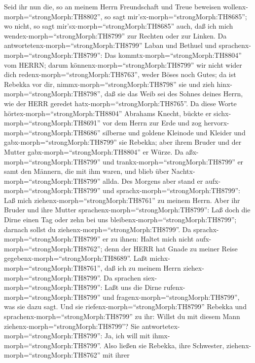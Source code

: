  Seid ihr nun die, so an meinem Herrn Freundschaft und
Treue beweisen wollenx-morph=``strongMorph:TH8802'', so sagt
mir'sx-morph=``strongMorph:TH8685''; wo nicht, so sagt
mir'sx-morph=``strongMorph:TH8685'' auch, daß ich mich
wendex-morph=``strongMorph:TH8799'' zur Rechten oder zur Linken.
 Da antwortetenx-morph=``strongMorph:TH8799'' Laban und
Bethuel und sprachenx-morph=``strongMorph:TH8799'': Das
kommtx-morph=``strongMorph:TH8804'' vom HERRN; darum
könnenx-morph=``strongMorph:TH8799'' wir nicht wider dich
redenx-morph=``strongMorph:TH8763'', weder Böses noch Gutes;
 da ist Rebekka vor dir, nimmx-morph=``strongMorph:TH8798''
sie und zieh hinx-morph=``strongMorph:TH8798'', daß sie das Weib sei des
Sohnes deines Herrn, wie der HERR geredet
hatx-morph=``strongMorph:TH8765''.  Da diese Worte
hörtex-morph=``strongMorph:TH8804'' Abrahams Knecht, bückte er
sichx-morph=``strongMorph:TH8691'' vor dem Herrn zur Erde 
und zog hervorx-morph=``strongMorph:TH8686'' silberne und goldene
Kleinode und Kleider und gabx-morph=``strongMorph:TH8799'' sie Rebekka;
aber ihrem Bruder und der Mutter gabx-morph=``strongMorph:TH8804'' er
Würze.  Da aßx-morph=``strongMorph:TH8799'' und
trankx-morph=``strongMorph:TH8799'' er samt den Männern, die mit ihm
waren, und blieb über Nachtx-morph=``strongMorph:TH8799'' allda. Des
Morgens aber stand er aufx-morph=``strongMorph:TH8799'' und
sprachx-morph=``strongMorph:TH8799'': Laß mich
ziehenx-morph=``strongMorph:TH8761'' zu meinem Herrn.  Aber
ihr Bruder und ihre Mutter sprachenx-morph=``strongMorph:TH8799'': Laß
doch die Dirne einen Tag oder zehn bei uns
bleibenx-morph=``strongMorph:TH8799''; darnach sollst du
ziehenx-morph=``strongMorph:TH8799''.  Da
sprachx-morph=``strongMorph:TH8799'' er zu ihnen: Haltet mich nicht
aufx-morph=``strongMorph:TH8762''; denn der HERR hat Gnade zu meiner
Reise gegebenx-morph=``strongMorph:TH8689''. Laßt
michx-morph=``strongMorph:TH8761'', daß ich zu meinem Herrn
ziehex-morph=``strongMorph:TH8799''.  Da sprachen
siex-morph=``strongMorph:TH8799'': Laßt uns die Dirne
rufenx-morph=``strongMorph:TH8799'' und
fragenx-morph=``strongMorph:TH8799'', was sie dazu sagt. 
Und sie riefenx-morph=``strongMorph:TH8799'' Rebekka und
sprachenx-morph=``strongMorph:TH8799'' zu ihr: Willst du mit diesem Mann
ziehenx-morph=``strongMorph:TH8799''? Sie
antwortetex-morph=``strongMorph:TH8799'': Ja, ich will mit
ihmx-morph=``strongMorph:TH8799''.  Also ließen sie
Rebekka, ihre Schwester, ziehenx-morph=``strongMorph:TH8762'' mit ihrer
